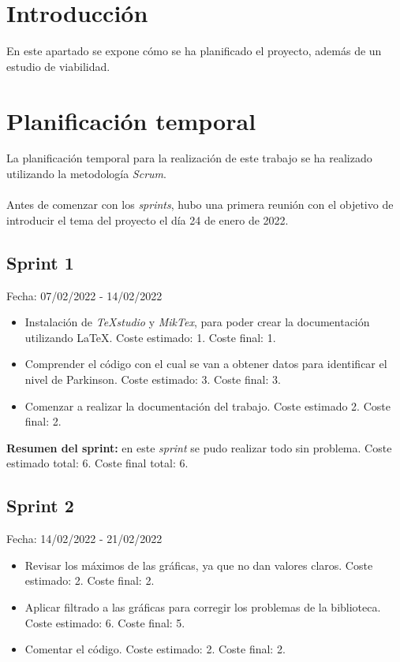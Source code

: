 
\section{Introducción}
En este apartado se expone cómo se ha planificado el proyecto, además de un estudio de viabilidad.
\section{Planificación temporal}
La planificación temporal para la realización de este trabajo se ha realizado utilizando la metodología \textit{Scrum}.\\
\\
Antes de comenzar con los \textit{sprints}, hubo una primera reunión con el objetivo de introducir el tema del proyecto el día 24 de enero de 2022.

\subsection{Sprint 1}
Fecha: 07/02/2022 - 14/02/2022
\begin{itemize}
	\item Instalación de \textit{TeXstudio} y \textit{MikTex}, para poder crear la documentación utilizando \LaTeX{}. Coste estimado: 1. Coste final: 1.
	\item Comprender el código con el cual se van a obtener datos para identificar el nivel de Parkinson. Coste estimado: 3. Coste final: 3.
	\item Comenzar a realizar la documentación del trabajo. Coste estimado 2. Coste final: 2.
\end{itemize}

\textbf{Resumen del sprint:} en este \textit{sprint} se pudo realizar todo sin problema. Coste estimado total: 6. Coste final total: 6.

\subsection{Sprint 2}
Fecha: 14/02/2022 - 21/02/2022
\begin{itemize}
	\item Revisar los máximos de las gráficas, ya que no dan valores claros. Coste estimado: 2. Coste final: 2. 
	\item Aplicar filtrado a las gráficas para corregir los problemas de la biblioteca. Coste estimado: 6. Coste final: 5.
	\item Comentar el código. Coste estimado: 2. Coste final: 2.
\end{itemize}

